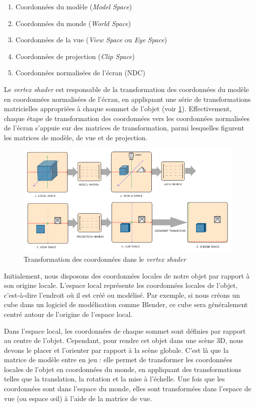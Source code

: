 \begin{samepage}
\begin{enumerate}
    \item Coordonnées du modèle (\textit{Model Space})
    \item Coordonnées du monde (\textit{World Space})
    \item Coordonnées de la vue (\textit{View Space} ou \textit{Eye Space})
    \item Coordonnées de projection (\textit{Clip Space})
    \item Coordonnées normalisées de l'écran (NDC)
\end{enumerate}
\end{samepage}

Le \textit{vertex shader} est responsable de la transformation des coordonnées du modèle en coordonnées normalisées de l'écran, en appliquant une série de transformations matricielles appropriées à chaque sommet de l'objet (voir \ref{syscoord00}). Effectivement, chaque étape de transformation des coordonnées vers les coordonnées normalisées de l'écran s'appuie sur des matrices de transformation, parmi lesquelles figurent les matrices de modèle, de vue et de projection. 

\begin{figure}[h]
    \centering
    \includegraphics[width=0.75\linewidth]{images//shaders/syscoord00.png}
    \caption{Transformation des coordonnées dans le \textit{vertex shader}}
    \label{syscoord00}
\end{figure}

Initialement, nous disposons des coordonnées locales de notre objet par rapport à son origine locale. L'espace local représente les coordonnées locales de l'objet, c'est-à-dire l'endroit où il est créé ou modélisé. Par exemple, si nous créons un cube dans un logiciel de modélisation comme Blender, ce cube sera généralement centré autour de l'origine de l'espace local. 

Dans l'espace local, les coordonnées de chaque sommet sont définies par rapport au centre de l'objet. Cependant, pour rendre cet objet dans une scène 3D, nous devons le placer et l'orienter par rapport à la scène globale. C'est là que la matrice de modèle entre en jeu : elle permet de transformer les coordonnées locales de l'objet en coordonnées du monde, en appliquant des transformations telles que la translation, la rotation et la mise à l'échelle. Une fois que les coordonnées sont dans l'espace du monde, elles sont transformées dans l'espace de vue (ou espace œil) à l'aide de la matrice de vue. 

